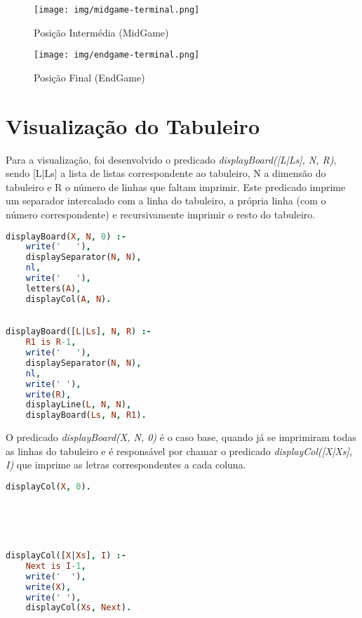 \documentclass[a4paper]{article}
\begin{document}
\bigskip

\begin{figure}[h!]
\centering
\begin{minipage}{.4\textwidth}
  \centering
  \texttt{[image: img/midgame-terminal.png]}
  \caption{Posição Intermédia (MidGame)}
  \label{fig:mid}
\end{minipage}%
\begin{minipage}{.4\textwidth}
  \centering
  \texttt{[image: img/endgame-terminal.png]}
  \caption{Posição Final (EndGame)}
  \label{fig:end}
\end{minipage}
\end{figure}
\newpage
\section{Visualização do Tabuleiro}

Para a visualização, foi desenvolvido o predicado \textit{displayBoard([L|Ls], N, R)}, sendo [L|Ls] a lista de listas correspondente ao tabuleiro, N a dimensão do tabuleiro e R o número de linhas que faltam imprimir. Este predicado imprime um separador intercalado com a linha do tabuleiro, a própria linha (com o número correspondente) e recursivamente imprimir o resto do tabuleiro.

\begin{multicols}{2}
\begin{lstlisting}[language=Prolog]
displayBoard(X, N, 0) :- 
	write('   '), 
	displaySeparator(N, N), 
	nl, 
	write('   '), 
	letters(A), 
	displayCol(A, N).
	

displayBoard([L|Ls], N, R) :- 
	R1 is R-1,
	write('   '), 
	displaySeparator(N, N),
	nl, 
	write(' '), 
	write(R),
	displayLine(L, N, N),
	displayBoard(Ls, N, R1).
\end{lstlisting}
\end{multicols}

O predicado \textit{displayBoard(X, N, 0)} é o caso base, quando já se imprimiram todas as linhas do tabuleiro e é responsável por chamar o predicado \textit{displayCol([X|Xs], I)} que imprime as letras correspondentes a cada coluna.

\begin{multicols}{2}
\begin{lstlisting}[language=Prolog]
displayCol(X, 0).





displayCol([X|Xs], I) :- 
	Next is I-1, 
	write('  '), 
	write(X), 
	write(' '), 
	displayCol(Xs, Next).
\end{lstlisting}
\end{multicols}
\end{document}
